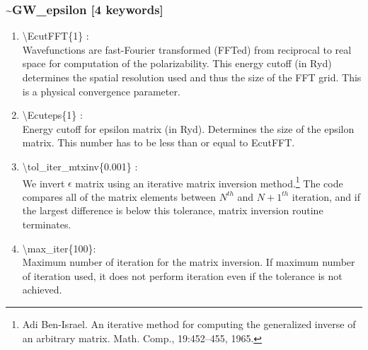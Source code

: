 \documentclass[letterpaper,12pt]{article}
\newcommand{\openatom}{\textsc{OpenAtom}}
\newcommand{\red}{\color{red}}
\begin{document}
\subsubsection*{\bf \~{}GW\_epsilon [4 keywords]}
\begin{enumerate}

 \vspace{0.15in}
 \item   \textbackslash{}EcutFFT\{1\} : \\ 
 Wavefunctions are fast-Fourier transformed (FFTed) from reciprocal to real space for computation of the polarizability. This energy cutoff (in Ryd) determines the spatial resolution used and thus the size of the FFT grid.  This is a physical convergence parameter.
 
 \vspace{0.15in}
 \item   \textbackslash{}Ecuteps\{1\} : \\
 Energy cutoff for epsilon matrix (in Ryd).  Determines the size of the epsilon matrix. This number has to be less than or equal to EcutFFT.\\

 
 \vspace{0.15in}
 \item   \textbackslash{}tol\_iter\_mtxinv\{0.001\} : \\ 
 We invert $\epsilon$ matrix using an iterative matrix inversion method.\footnote{Adi Ben-Israel. An iterative method for computing the generalized inverse of an arbitrary matrix. Math. Comp., 19:452--455, 1965.}
 The code compares all of the matrix elements between $N^{th}$ and $N+1^{th}$ iteration, and if the largest difference is below this tolerance, matrix inversion routine terminates. 

 
 \vspace{0.15in}
 \item 
 \textbackslash{}max\_iter\{100\}: \\
 Maximum number of iteration for the matrix inversion. If maximum number of iteration used, it does not perform iteration even if the tolerance is not achieved. 

 
 
\end{enumerate}
\end{document}
